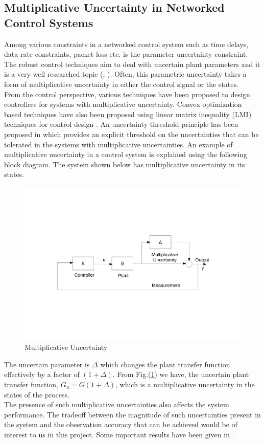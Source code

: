 \documentclass[a4paper,12pt]{article}
\begin{document}
	\subsection{Multiplicative Uncertainty in Networked Control Systems}
	Among various constraints in a networked control system such as time delays, data rate constraints, packet loss etc. is the parameter uncertainty constraint. The robust control techniques aim to deal with uncertain plant parameters and it is a very well researched topic (\cite{robust1}, \cite{robust2}). Often, this parametric uncertainty takes a form of multiplicative uncertainty in either the control signal or the states.  \\
	From the control perspective, various techniques have been proposed to design controllers for systems with multiplicative uncertainty. Convex optimization based techniques have also been proposed using linear matrix inequality (LMI) techniques for control design \cite{lmi}. An uncertainty threshold principle has been proposed in \cite{uncthres} which provides an explicit threshold on the uncertainties that can be tolerated in the systems with multiplicative uncertainties. An example of multiplicative uncertainty in a control system is explained using the following block diagram. The system shown below has multiplicative uncertainty in its states.
		\begin{figure}[H]

			  \centering
%			  
			\includegraphics[scale=0.5]{mult}
			  \caption{Multiplicative Uncertainty}
			 \label{mult}
		\end{figure}	
		The uncertain parameter is $\Delta$ which changes the plant transfer function effectively by a factor of $(1+\Delta)$. From Fig.(\ref{mult}) we have, the uncertain plant transfer function, $G_{u}=G(1+\Delta)$, which is a multiplicative uncertainty in the states of the process.\\
		The presence of such multiplicative uncertainties also affects the system performance. The tradeoff between the magnitude of such uncertainties present in the system and the observation accuracy that can be achieved would be of interest to us in this project. Some important results have been given in \cite{mult_thesis}.
\end{document}
